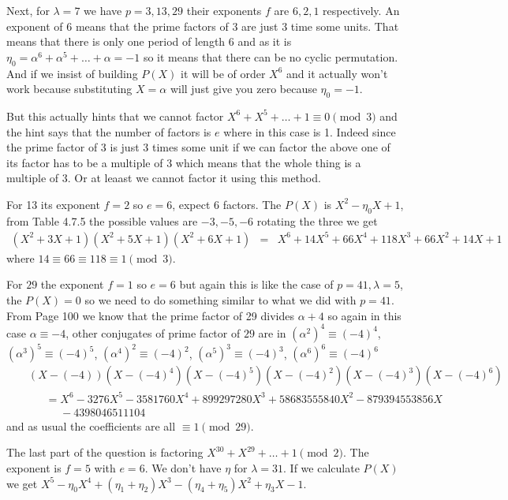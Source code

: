 \documentclass[aps,preprint,preprintnumbers,nofootinbib,showpacs,prd]{revtex4-1}
\newcommand{\nbea}{\begin{eqnarray*}}
\newcommand{\neea}{\end{eqnarray*}}
\begin{document}
Next, for $\lambda = 7$ we have $p = 3, 13, 29$ their exponents $f$ are $6, 2, 1$ respectively. An exponent of $6$ means that the prime factors of $3$ are just $3$ time some units. That means that there is only one period of length 6 and as it is $\eta_0 = \alpha^6 + \alpha^5 + \dots + \alpha = -1$ so it means that there can be no cyclic permutation. And if we insist of building $P(X)$ it will be of order $X^6$ and it actually won't work because substituting $X=\alpha$ will just give you zero because $\eta_0 = -1$.

But this actually hints that we cannot factor $X^6 + X^5 + \dots + 1 \equiv 0 \pmod{3}$ and the hint says that the number of factors is $e$ where in this case is 1. Indeed since the prime factor of 3 is just 3 times some unit if we can factor the above one of its factor has to be a multiple of 3 which means that the whole thing is a multiple of 3. Or at leaast we cannot factor it using this method.

For 13 its exponent $f = 2$ so $e = 6$, expect 6 factors. The $P(X)$ is $X^2 - \eta_0X + 1$, from Table 4.7.5 the possible values are $-3, -5, -6$ rotating the three we get
%
\nbea
(X^2 + 3X + 1)(X^2 + 5X + 1)(X^2 + 6X + 1) & = & X^6+14X^5+66X^4+118X^3+66X^2+14X+1
\neea
%
where $14\equiv66\equiv118\equiv1\pmod{3}$.

For $29$ the exponent $f=1$ so $e = 6$ but again this is like the case of $p = 41, \lambda = 5$, the $P(X) = 0$ so we need to do something similar to what we did with $p = 41$. From Page 100 we know that the prime factor of 29 divides $\alpha + 4$ so again in this case $\alpha \equiv -4$, other conjugates of prime factor of $29$ are in $(\alpha^2)^4 \equiv (-4)^4$, $(\alpha^3)^5 \equiv (-4)^5$, $(\alpha^4)^2 \equiv (-4)^2$, $(\alpha^5)^3 \equiv (-4)^3$, $(\alpha^6)^6 \equiv (-4)^6$
%
\nbea
&& (X-(-4))(X-(-4)^4)(X-(-4)^5)(X-(-4)^2)(X-(-4)^3)(X-(-4)^6) \\
&& ~~~~~~~ = X^6-3276X^5-3581760X^4+899297280X^3+58683555840X^2-879394553856X \\
&& ~~~~~~~~~~~~~-4398046511104
\neea
%
and as usual the coefficients are all $\equiv 1 \pmod{29}$.

The last part of the question is factoring $X^{30} + X^{29} + \dots + 1 \pmod{2}$. The exponent is $f = 5$ with $e = 6$. We don't have $\eta$ for $\lambda = 31$. If we calculate $P(X)$ we get $X^5 - \eta_0 X^4 + (\eta_1 + \eta_2) X^3 -(\eta_4 + \eta_5)X^2 +\eta_3X - 1$.
\end{document}
